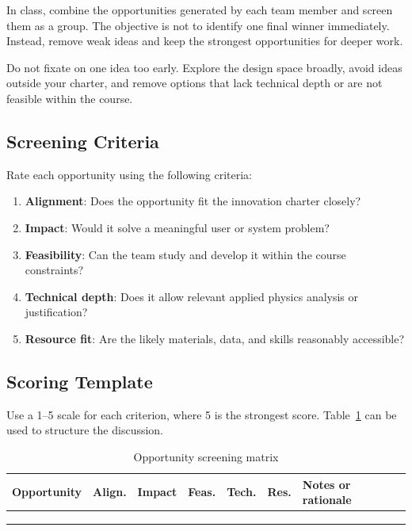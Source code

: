 In class, combine the opportunities generated by each team member and screen them as a group. The objective is not to identify one final winner immediately. Instead, remove weak ideas and keep the strongest opportunities for deeper work.

\begin{tcolorbox}[title=Common Mistakes]
Do not fixate on one idea too early. Explore the design space broadly, avoid ideas outside your charter, and remove options that lack technical depth or are not feasible within the course.
\end{tcolorbox}

\subsection{Screening Criteria}

Rate each opportunity using the following criteria:
\begin{enumerate}
    \item \textbf{Alignment}: Does the opportunity fit the innovation charter closely?
    \item \textbf{Impact}: Would it solve a meaningful user or system problem?
    \item \textbf{Feasibility}: Can the team study and develop it within the course constraints?
    \item \textbf{Technical depth}: Does it allow relevant applied physics analysis or justification?
    \item \textbf{Resource fit}: Are the likely materials, data, and skills reasonably accessible?
\end{enumerate}

\subsection{Scoring Template}

Use a 1--5 scale for each criterion, where 5 is the strongest score. Table~\ref{tab:session4-screening-matrix} can be used to structure the discussion.

\begin{table}[htbp]
\centering
\caption{Opportunity screening matrix}
\label{tab:session4-screening-matrix}
\renewcommand{\arraystretch}{1.2}
\begin{tabularx}{\textwidth}{|>{\raggedright\arraybackslash}X|c|c|c|c|c|>{\raggedright\arraybackslash}p{}|}
\hline
\textbf{Opportunity} & \textbf{Align.} & \textbf{Impact} & \textbf{Feas.} & \textbf{Tech.} & \textbf{Res.} & \textbf{Notes or rationale} \\
\hline
 &  &  &  &  &  &  \\
\hline
 &  &  &  &  &  &  \\
\hline
 &  &  &  &  &  &  \\
\hline
\end{tabularx}
\end{table}

